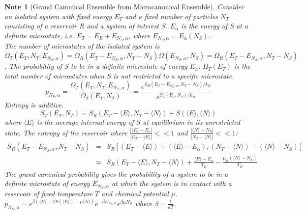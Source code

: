 \documentclass[a4paper]{article}
\newtheorem{Note}{Note}[section]
\theoremstyle{new}
\begin{document}
\begin{Note}[Grand Canonical Ensemble from Microcanonical Ensemble]
Consider an isolated system with fixed energy $E_T$ and a fixed number of particles $N_T$ consisting of a reservoir R and a system of interest $S$. $E_\alpha$ is the energy of S at a definite microstate, i.e. $E_T=E_R+E_{N_S,\alpha}$, where $E_{N_S,\alpha}=E_\alpha(N_S)$.\\[5pt]
The number of microstates of the isolated system is $\Omega_T(E_T,N_T;E_{N_S,\alpha})=\Omega_R(E_T-E_{N_S,\alpha},N_T-N_S)\Omega(E_{N_S,\alpha},N_S)=\Omega_R(E_T-E_{N_S,\alpha},N_T-N_S)$. The probability of S to be in a definite microstate of energy $E_\alpha$: $\Omega_T(E_T)$ is the total number of microstates when S is not restricted to a specific microstate.
$$p_{N_S,\alpha}=\frac{\Omega_T(E_T,N_T;E_{N_S,\alpha})}{\Omega_T(E_T,N_T)}=\frac{e^{S_R(E_T-E_{N_S,\alpha},N_T-N_S)/k_B}}{e^{S_T(E_T,N_T)/k_B}}$$
Entropy is additive. 
$$S_T(E_T,N_T)=S_R(E_T-\langle E\rangle,N_T-\langle N\rangle)+S(\langle E\rangle,\langle N\rangle)$$
where $\langle E\rangle$ is the average internal energy of $S$ at equilibrium in its unrestricted state. The entropy of the reservoir where $\frac{|\langle E\rangle-E_\alpha|}{|E_T-\langle E\rangle|}<<1$ and $\frac{|\langle N\rangle-N_S|}{|N_T-\langle N\rangle|}<<1$:
\begin{eqnarray}
S_R(E_T-E_{N_S,\alpha},N_T-N_S)&=&S_R[(E_T-\langle E\rangle)+(\langle E\rangle-E_\alpha),(N_T-\langle N\rangle)+(\langle N\rangle-N_S)]\nonumber\\&\approx&S_R(E_T-\langle E\rangle,N_T-\langle N\rangle)+\frac{\langle E\rangle-E_\alpha}{T_R}-\frac{\mu_R(\langle N\rangle-N_S)}{T_R}\nonumber
\end{eqnarray}
The grand canonical probability gives the probability of a system to be in a definite microstate of energy $E_{N_S,\alpha}$ at which the system is in contact with a reservoir of fixed temperature $T$ and chemical potential $\mu$. $p_{N_S,\alpha}=e^{\beta(\langle E\rangle-TS(\langle E\rangle)-\mu\langle N\rangle)}e^{-\beta E_{N_S,\alpha}}e^{\beta\mu N_S}$ where $\beta=\frac{1}{kT}$.
\end{Note}
\end{document}
